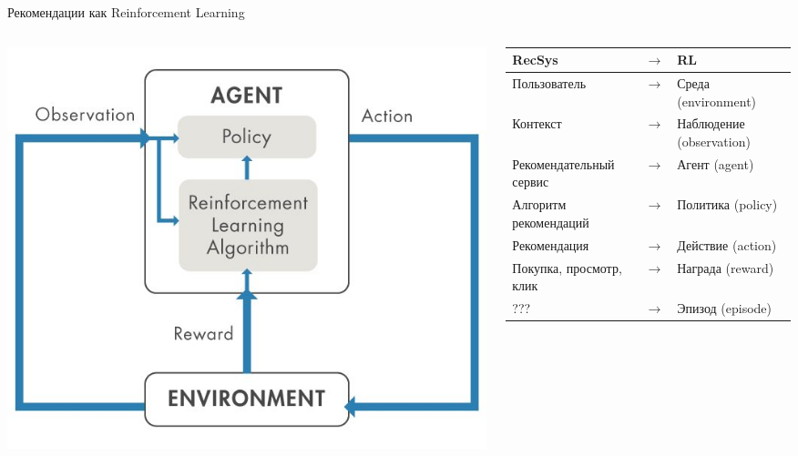 \documentclass[11pt,aspectratio=169,handout]{beamer}
\begin{document}
\begin{frame}{Рекомендации как Reinforcement Learning}

\begin{columns}

\begin{column}{0.3\textwidth}
\begin{center}
\includegraphics[scale=0.2]{images/rl.jpeg}
\end{center}
\end{column}

\begin{column}{0.65\textwidth}

\begin{footnotesize}
\begin{center}
\begin{tabular}{l c l}
RecSys & $\rightarrow$ & RL \\
\hline
Пользователь & $\rightarrow$ & \pause Среда (environment) \\
Контекст & $\rightarrow$ & \pause Наблюдение (observation) \\
Рекомендательный сервис & $\rightarrow$ &  \pause Агент (agent) \\
Алгоритм рекомендаций & $\rightarrow$ &  \pause Политика (policy) \\
Рекомендация & $\rightarrow$ & \pause Действие (action) \\ 
Покупка, просмотр, клик & $\rightarrow$ &  \pause Награда (reward) \\
??? & $\rightarrow$ &  \pause Эпизод (episode) \\
\end{tabular}
\end{center}
\end{footnotesize}

\end{column}
\end{columns}

\end{frame}
\end{document}
